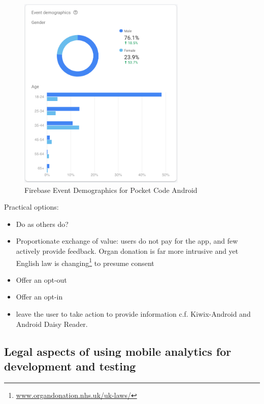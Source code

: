 \begin{figure}[htbp!]
    \centering
    \includegraphics[width=8cm]{images/firebase/Firebase-event-demographics-pocketcode-android.pdf}
    \caption{Firebase Event Demographics for Pocket Code Android}
    \label{fig:Firebase-event-demographics-pocketcode-android}
\end{figure}

Practical options:
\begin{itemize}
    \item Do as others do?
    \item Proportionate exchange of value: users do not pay for the app, and few actively provide feedback. Organ donation is far more intrusive and yet English law is changing\footnote{\href{https://www.organdonation.nhs.uk/uk-laws/}{www.organdonation.nhs.uk/uk-laws/}} to presume consent~\cite{NHS_organ_donation_in_england} 
    \item Offer an opt-out
    \item Offer an opt-in
    \item leave the user to take action to provide information c.f. Kiwix-Android and Android Daisy Reader.
\end{itemize}

\subsection{Legal aspects of using mobile analytics for development and testing}

